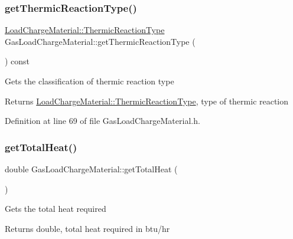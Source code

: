 \mbox{\label{class_gas_load_charge_material_ac801f30ccf58ce98fdb6b8cdb0a9767f}} 
\subsubsection{\texorpdfstring{get\+Thermic\+Reaction\+Type()}{getThermicReactionType()}}
{\footnotesize\ttfamily \hyperlink{namespace_load_charge_material_a51d4263e865a5d86236622dd3fe23fd1}{Load\+Charge\+Material\+::\+Thermic\+Reaction\+Type} Gas\+Load\+Charge\+Material\+::get\+Thermic\+Reaction\+Type (\begin{DoxyParamCaption}{ }\end{DoxyParamCaption}) const\hspace{0.3cm}{\ttfamily [inline]}}

Gets the classification of thermic reaction type \begin{DoxyReturn}{Returns}
\hyperlink{namespace_load_charge_material_a51d4263e865a5d86236622dd3fe23fd1}{Load\+Charge\+Material\+::\+Thermic\+Reaction\+Type}, type of thermic reaction 
\end{DoxyReturn}


Definition at line 69 of file Gas\+Load\+Charge\+Material.\+h.

\mbox{\label{class_gas_load_charge_material_a4f831537652ca09c4539982c626cc164}} 
\subsubsection{\texorpdfstring{get\+Total\+Heat()}{getTotalHeat()}}
{\footnotesize\ttfamily double Gas\+Load\+Charge\+Material\+::get\+Total\+Heat (\begin{DoxyParamCaption}{ }\end{DoxyParamCaption})\hspace{0.3cm}{\ttfamily [inline]}}

Gets the total heat required \begin{DoxyReturn}{Returns}
double, total heat required in btu/hr 
\end{DoxyReturn}


